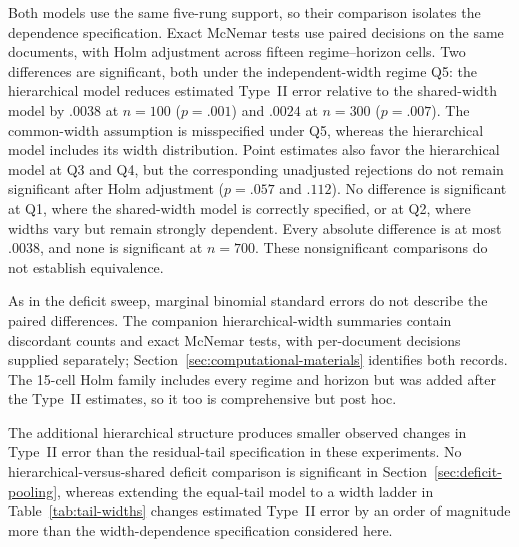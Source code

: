 \documentclass[11pt]{article}
\begin{document}
Both models use the same five-rung support, so their comparison isolates the
dependence specification.  Exact McNemar tests use paired decisions on the same
documents, with Holm adjustment across fifteen regime--horizon cells.  Two
differences are significant, both under the independent-width regime Q5: the
hierarchical model reduces estimated Type~II error relative to the shared-width
model by $.0038$ at $n=100$ ($p=.001$) and $.0024$ at $n=300$ ($p=.007$).
The common-width assumption is misspecified under Q5, whereas the hierarchical
model includes its width distribution.  Point estimates also favor the
hierarchical model at Q3 and Q4, but the corresponding unadjusted rejections
do not remain significant after Holm adjustment ($p=.057$ and $.112$).
No difference is significant at Q1, where the shared-width model is correctly
specified, or at Q2, where widths vary but remain strongly dependent.
Every absolute difference is at most $.0038$, and none is significant at
$n=700$.  These nonsignificant comparisons do not establish equivalence.

As in the deficit sweep, marginal binomial standard errors do not describe the
paired differences.  The companion hierarchical-width summaries contain discordant counts and exact McNemar tests, with per-document decisions supplied separately; Section~\ref{sec:computational-materials} identifies both records.  The 15-cell Holm family includes
every regime and horizon but was added after the Type~II estimates, so it too
is comprehensive but post hoc.

The additional hierarchical structure produces smaller observed changes in
Type~II error than the residual-tail specification in these experiments.
No hierarchical-versus-shared deficit comparison is significant in
Section~\ref{sec:deficit-pooling}, whereas extending the equal-tail model to a
width ladder in Table~\ref{tab:tail-widths} changes estimated Type~II error by an
order of magnitude more than the width-dependence specification considered here.
\end{document}
